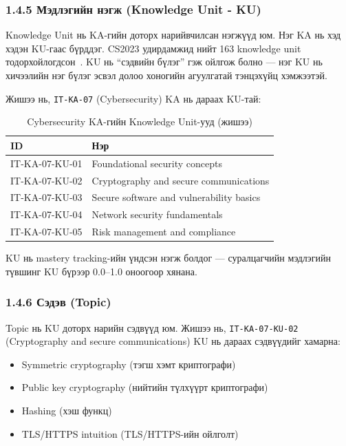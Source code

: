\documentclass[12pt,A4]{report}
\newcommand{\eng}[1]{#1}
\begin{document}
\subsubsection{1.4.5 Мэдлэгийн нэгж (\eng{Knowledge Unit} - KU)}

\eng{Knowledge Unit} нь KA-гийн доторх нарийвчилсан нэгжүүд юм. Нэг KA нь хэд хэдэн KU-гаас бүрддэг. CS2023 удирдамжид нийт 163 \eng{knowledge unit} тодорхойлогдсон~\cite{cs2023beta}. KU нь ``сэдвийн бүлэг'' гэж ойлгож болно --- нэг KU нь хичээлийн нэг бүлэг эсвэл долоо хоногийн агуулгатай тэнцэхүйц хэмжээтэй.

Жишээ нь, \texttt{IT-KA-07} (Cybersecurity) KA нь дараах KU-тай:

\begin{table}[h!]
\centering
\caption{Cybersecurity KA-гийн Knowledge Unit-ууд (жишээ)}
\label{tab:ku_examples}
\begin{tabularx}{\textwidth}{>{\ttfamily}l X}
\toprule
\textbf{ID} & \textbf{Нэр} \\
\midrule
\rowcolor{lightbg}
IT-KA-07-KU-01 & \eng{Foundational security concepts} \\
IT-KA-07-KU-02 & \eng{Cryptography and secure communications} \\
\rowcolor{lightbg}
IT-KA-07-KU-03 & \eng{Secure software and vulnerability basics} \\
IT-KA-07-KU-04 & \eng{Network security fundamentals} \\
\rowcolor{lightbg}
IT-KA-07-KU-05 & \eng{Risk management and compliance} \\
\bottomrule
\end{tabularx}
\end{table}

KU нь \eng{mastery tracking}-ийн үндсэн нэгж болдог --- суралцагчийн мэдлэгийн түвшинг KU бүрээр 0.0--1.0 оноогоор хянана.

\subsubsection{1.4.6 Сэдэв (\eng{Topic})}

\eng{Topic} нь KU доторх нарийн сэдвүүд юм. Жишээ нь, \texttt{IT-KA-07-KU-02} (\eng{Cryptography and secure communications}) KU нь дараах сэдвүүдийг хамарна:

\begin{itemize}
    \item \eng{Symmetric cryptography} (тэгш хэмт криптографи)
    \item \eng{Public key cryptography} (нийтийн түлхүүрт криптографи)
    \item \eng{Hashing} (хэш функц)
    \item \eng{TLS/HTTPS intuition} (TLS/HTTPS-ийн ойлголт)
\end{itemize}
\end{document}
